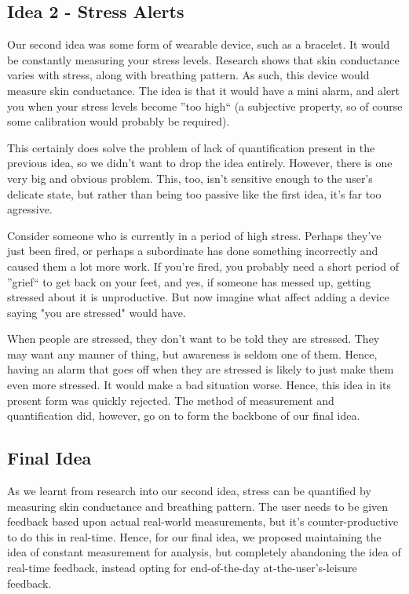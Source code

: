 \documentclass{scrartcl}
\begin{document}
\subsection{Idea 2 - Stress Alerts}
Our second idea was some form of wearable device, such as a bracelet. It would be constantly measuring your stress levels.
Research shows that skin conductance varies with stress, along with breathing pattern. As such, this device would measure
skin conductance. The idea is that it would have a mini alarm, and alert you when your stress levels become ''too high``
(a subjective property, so of course some calibration would probably be required).

This certainly does solve the problem of lack of quantification present in the previous idea, so we didn't want to drop
the idea entirely. However, there is one very big and obvious problem. This, too, isn't sensitive enough to the user's
delicate state, but rather than being too passive like the first idea, it's far too agressive.

Consider someone who is currently in a period of high stress. Perhaps they've just been fired, or perhaps a subordinate has
done something incorrectly and caused them a lot more work. If you're fired, you probably need a short period of ''grief``
to get back on your feet, and yes, if someone has messed up, getting stressed about it is unproductive. But now imagine what
affect adding a device saying "you are stressed" would have.

When people are stressed, they don't want to be told they are stressed. They may want any manner of thing, but awareness
is seldom one of them. Hence, having an alarm that goes off when they are stressed is likely to just make them even more
stressed. It would make a bad situation worse. Hence, this idea in its present form was quickly rejected. The method of
measurement and quantification did, however, go on to form the backbone of our final idea.

\subsection{Final Idea}

As we learnt from research into our second idea, stress can be quantified by measuring skin conductance and breathing pattern.
The user needs to be given feedback based upon actual real-world measurements, but it's counter-productive to do this in
real-time. Hence, for our final idea, we proposed maintaining the idea of constant measurement for analysis,
but completely abandoning the idea of real-time feedback, instead opting for end-of-the-day at-the-user's-leisure feedback.
\end{document}
